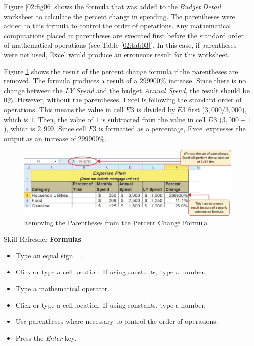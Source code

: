 Figure \ref{02:fig06} shows the formula that was added to the \textit{Budget Detail} worksheet to calculate the percent change in spending. The parentheses were added to this formula to control the order of operations. Any mathematical computations placed in parentheses are executed first before the standard order of mathematical operations (see Table \ref{02:tab03}). In this case, if parentheses were not used, Excel would produce an erroneous result for this worksheet.

Figure \ref{02:fig07} shows the result of the percent change formula if the parentheses are removed. The formula produces a result of a $ 299900\% $ increase. Since there is no change between the \textit{LY Spend} and the budget \textit{Annual Spend}, the result should be 0\%. However, without the parentheses, Excel is following the standard order of operations. This means the value in cell $ E3 $ is divided by $ E3 $ first ($ 3,000 / 3,000 $), which is $ 1 $. Then, the value of $ 1 $ is subtracted from the value in cell $ D3 $ ($ 3,000 - 1 $), which is $ 2,999 $. Since cell $ F3 $ is formatted as a percentage, Excel expresses the output as an increase of $ 299900\% $.

\begin{figure}[H]
	\centering
	\includegraphics[width=\maxwidth{.95\linewidth}]{gfx/ch02_fig07}
	\caption{Removing the Parentheses from the Percent Change Formula}
	\label{02:fig07}
\end{figure}

\begin{center}
	\begin{sklbox}{Skill Refresher}
		\textbf{Formulas}
		\\
		\begin{itemize}
			\setlength{\itemsep}{0pt}
			\setlength{\parskip}{0pt}
			\setlength{\parsep}{0pt}
			
			\item Type an equal sign \textit{=}.
			\item Click or type a cell location. If using constants, type a number.
			\item Type a mathematical operator.
			\item Click or type a cell location. If using constants, type a number.
			\item Use parentheses where necessary to control the order of operations.
			\item Press the \textit{Enter} key.

		\end{itemize}
	\end{sklbox}
\end{center}

